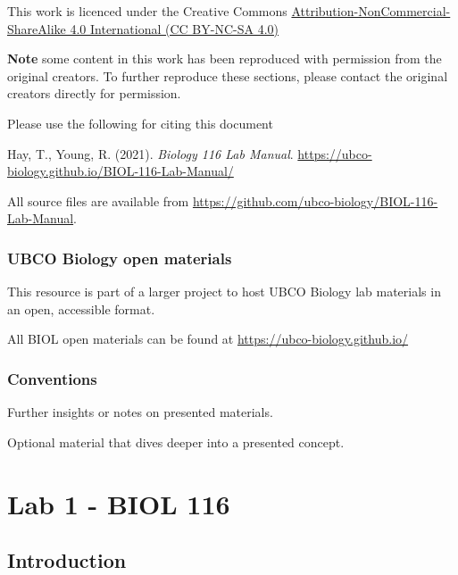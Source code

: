 \documentclass[
]{book}
\begin{document}
This work is licenced under the Creative Commons \href{https://creativecommons.org/licenses/by-nc-sa/4.0/}{Attribution-NonCommercial-ShareAlike 4.0 International (CC BY-NC-SA 4.0)}

\textbf{Note} some content in this work has been reproduced with permission from the original creators. To further reproduce these sections, please contact the original creators directly for permission.

Please use the following for citing this document

Hay, T., Young, R. (2021). \emph{Biology 116 Lab Manual}. \url{https://ubco-biology.github.io/BIOL-116-Lab-Manual/}

All source files are available from \url{https://github.com/ubco-biology/BIOL-116-Lab-Manual}.

\hypertarget{ubco-biology-open-materials}{%
\section*{UBCO Biology open materials}\label{ubco-biology-open-materials}}

This resource is part of a larger project to host UBCO Biology lab materials in an open, accessible format.

All BIOL open materials can be found at \url{https://ubco-biology.github.io/}

\hypertarget{conventions}{%
\section*{Conventions}\label{conventions}}

Further insights or notes on presented materials.

Optional material that dives deeper into a presented concept.

\hypertarget{part-lab-1---biol-116}{%
\part*{Lab 1 - BIOL 116}\label{part-lab-1---biol-116}}

\hypertarget{introduction}{%
\chapter*{Introduction}\label{introduction}}
\end{document}
